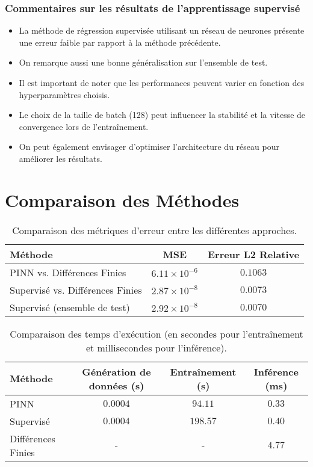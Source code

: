 \documentclass[11pt,a4paper]{article}
\begin{document}
\subsubsection*{Commentaires sur les résultats de l'apprentissage supervisé}
\begin{itemize}
    \item La méthode de régression supervisée utilisant un réseau de neurones présente une erreur faible par rapport à la méthode précédente.
    \item On remarque aussi une bonne généralisation sur l'ensemble de test.
    \item Il est important de noter que les performances peuvent varier en fonction des hyperparamètres choisis.
    \item Le choix de la taille de batch (128) peut influencer la stabilité et la vitesse de convergence lors de l'entraînement.
    \item On peut également envisager d'optimiser l'architecture du réseau pour améliorer les résultats.
\end{itemize}

\section{Comparaison des Méthodes}

\begin{table}[H]
    \centering
    \begin{tabular}{lcc}
        \toprule
        \textbf{Méthode} & \textbf{MSE} & \textbf{Erreur L2 Relative}\\
        \midrule
        PINN vs. Différences Finies & $6.11 \times 10^{-6}$ & $0.1063$ \\
        Supervisé vs. Différences Finies & $2.87 \times 10^{-8}$ & $0.0073$ \\
        Supervisé (ensemble de test) & $2.92 \times 10^{-8}$ & $0.0070$ \\
        \bottomrule
    \end{tabular}
    \caption{Comparaison des métriques d'erreur entre les différentes approches.}
    \label{tab:comparison}
\end{table}

\begin{table}[H]
    \centering
    \begin{tabular}{lccc}
        \toprule
        \textbf{Méthode} & \textbf{Génération de données (s)} & \textbf{Entraînement (s)} & \textbf{Inférence (ms)} \\
        \midrule
        PINN & $0.0004$ & $94.11$ & $0.33$ \\
        Supervisé & $0.0004$ & $198.57$ & $0.40$ \\
        Différences Finies & - & - & $4.77$ \\
        \bottomrule
    \end{tabular}
    \caption{Comparaison des temps d'exécution (en secondes pour l'entraînement et millisecondes pour l'inférence).}
    \label{tab:comparison_temps}
\end{table}
\end{document}

